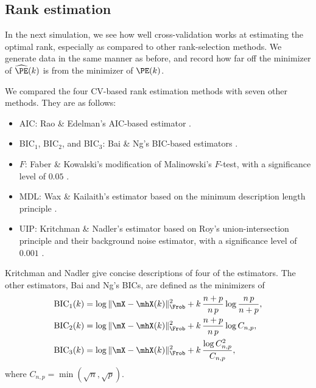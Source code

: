 \clearpage 

\subsection{Rank estimation}

In the next simulation, we see how well cross-validation works at estimating
the optimal rank, especially as compared to other rank-selection methods.  We 
generate data in the same manner as before, and record how far off the 
minimizer of $\widehat{\PE}(k)$ is from the minimizer of $\PE(k)$.

We compared the four CV-based rank estimation methods with seven other 
methods.  They are as follows:
\begin{itemize}
    \item AIC: Rao \& Edelman's AIC-based estimator 
        \cite{rao2008sample}.
    \item BIC$_1$, BIC$_2$, and BIC$_3$: Bai \& Ng's BIC-based estimators 
        \cite{bai2002dnf}.
    \item $F$: Faber \& Kowalski's modification of 
        Malinowski's  $F$-test, with a significance level of $0.05$  
        \cite{faber1997critical,malinowski1989statisticalf}.
    \item MDL: Wax \& Kailaith's estimator based on the minimum description 
        length principle
        \cite{wax1985detection} .
    \item UIP: Kritchman \& Nadler's estimator based on Roy's  
        union-intersection principle and their background noise estimator,      
        with a significance level of $0.001$
         \cite{kritchman2008determining,roy1953heuristic}.
\end{itemize}
Kritchman and Nadler \cite{kritchman2008determining} give concise descriptions 
of four of the estimators.  The other estimators, Bai and Ng's BICs, are 
defined as the minimizers of
\begin{align*}
    \text{BIC}_1(k)
        &= \log \| \mX - \mhX(k) \|_\Frob^2
           + k \, \frac{n + p}{n \, p} \log \frac{n \, p}{n + p}, \\
    \text{BIC}_2(k)
        &= \log \| \mX - \mhX(k) \|_\Frob^2
           + k \, \frac{n + p}{n \, p} \log C_{n,p}, \\
    \text{BIC}_3(k)
        &= \log \| \mX - \mhX(k) \|_\Frob^2
           + k \, \frac{\log C_{n,p}^2}{C_{n,p}},
\end{align*}
where $C_{n,p} = \min( \sqrt{n}, \sqrt{p})$.

